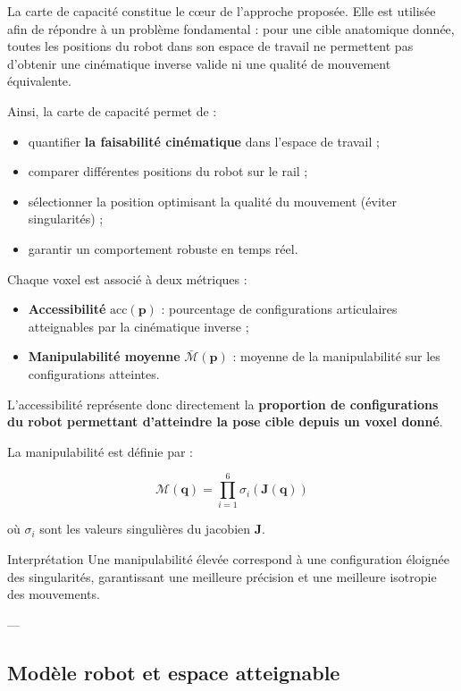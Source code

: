 \documentclass[11pt, a4paper]{article}
\begin{document}
La carte de capacité constitue le cœur de l’approche proposée. Elle est utilisée afin de répondre à un problème fondamental : pour une cible anatomique donnée, toutes les positions du robot dans son espace de travail ne permettent pas d’obtenir une cinématique inverse valide ni une qualité de mouvement équivalente.

Ainsi, la carte de capacité permet de :
\begin{itemize}
  \item quantifier \textbf{la faisabilité cinématique} dans l’espace de travail ;
  \item comparer différentes positions du robot sur le rail ;
  \item sélectionner la position optimisant la qualité du mouvement (éviter singularités) ;
  \item garantir un comportement robuste en temps réel.
\end{itemize}

Chaque voxel est associé à deux métriques :

\begin{itemize}
  \item \textbf{Accessibilité} $\mathrm{acc}(\mathbf{p})$ : pourcentage de configurations articulaires atteignables par la cinématique inverse ;
  \item \textbf{Manipulabilité moyenne} $\bar{\mathcal{M}}(\mathbf{p})$ : moyenne de la manipulabilité sur les configurations atteintes.
\end{itemize}

L’accessibilité représente donc directement la \textbf{proportion de configurations du robot permettant d’atteindre la pose cible depuis un voxel donné}.

La manipulabilité est définie par :

\begin{equation}
  \mathcal{M}(\mathbf{q}) = \prod_{i=1}^{6} \sigma_i(\mathbf{J}(\mathbf{q}))
\end{equation}

où $\sigma_i$ sont les valeurs singulières du jacobien $\mathbf{J}$.

\begin{techbox}{Interprétation}
Une manipulabilité élevée correspond à une configuration éloignée des singularités, garantissant une meilleure précision et une meilleure isotropie des mouvements.
\end{techbox}

---

\subsection{Modèle robot et espace atteignable}
\end{document}
